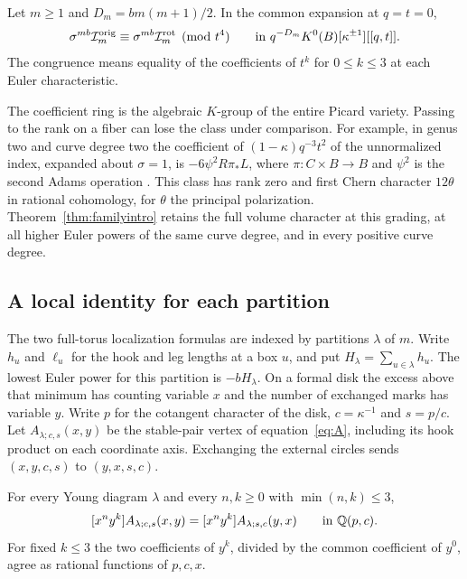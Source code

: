\begin{theorem}\label{thm:familyintro}
Let $m\ge1$ and $D_m=bm(m+1)/2$. In the common expansion at $q=t=0$,
\[
 \sigma^{mb}\mathcal I_m^{\rm orig}\equiv
 \sigma^{mb}\mathcal I_m^{\rm rot}\pmod {t^4}
 \qquad\text{in }q^{-D_m}K^0(B)[\kappa^{\pm1}][[q,t]].
\]
The congruence means equality of the coefficients of $t^k$ for $0\leq k\leq 3$ at each Euler characteristic.
\end{theorem}

The coefficient ring is the algebraic $K$-group of the entire Picard variety. Passing to the rank on a fiber can lose the class under comparison. For example, in genus two and curve degree two the coefficient of $(1-\kappa)q^{-3}t^2$ of the unnormalized index, expanded about $\sigma=1$, is $-6\psi^2 R\pi_*L$, where $\pi:C\times B\to B$ and $\psi^2$ is the second Adams operation \cite[Theorem~1.1]{W1}. This class has rank zero and first Chern character $12\theta$ in rational cohomology, for $\theta$ the principal polarization. Theorem~\ref{thm:familyintro} retains the full volume character at this grading, at all higher Euler powers of the same curve degree, and in every positive curve degree.

\subsection{A local identity for each partition}
The two full-torus localization formulas are indexed by partitions $\lambda$ of $m$. Write $h_u$ and $\ell_u$ for the hook and leg lengths at a box $u$, and put $H_\lambda=\sum_{u\in\lambda}h_u$. The lowest Euler power for this partition is $-bH_\lambda$. On a formal disk the excess above that minimum has counting variable $x$ and the number of exchanged marks has variable $y$. Write $p$ for the cotangent character of the disk, $c=\kappa^{-1}$ and $s=p/c$. Let $A_{\lambda;c,s}(x,y)$ be the stable-pair vertex of equation~\eqref{eq:A}, including its hook product on each coordinate axis. Exchanging the external circles sends $(x,y,c,s)$ to $(y,x,s,c)$.

\begin{theorem}\label{thm:diskintro}
For every Young diagram $\lambda$ and every $n,k\ge0$ with $\min(n,k)\le3$,
\[
 [x^ny^k]A_{\lambda;c,s}(x,y)
       =[x^ny^k]A_{\lambda;s,c}(y,x)
       \qquad\text{in }\mathbb Q(p,c).
\]
For fixed $k\le3$ the two coefficients of $y^k$, divided by the common coefficient of $y^0$, agree as rational functions of $p,c,x$.
\end{theorem}


